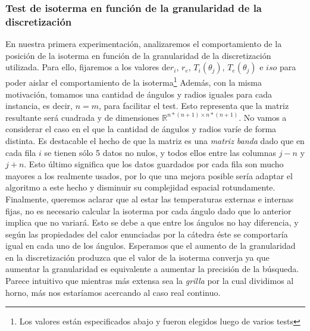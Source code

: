 \subsubsection{Test de isoterma en función de la granularidad de la discretización}

En nuestra primera experimentación, analizaremos el comportamiento de la posición de la isoterma en
función de la granularidad de la discretización utilizada. Para ello, fijaremos a los valores de$r_i$, $r_e$,
$T_i(\theta_j)$, $T_e(\theta_j)$ e $iso$ para poder aislar el comportamiento de la isoterma\footnote{Los
  valores están especificados abajo y fueron elegidos luego de varios tests}
Además, con la misma motivación, tomamos una cantidad de ángulos y radios iguales para cada
instancia, es decir, $n=m$, para facilitar el test.  Esto representa que la matriz resultante será
cuadrada y de dimensiones $\mathbb{R}^{n*(n+1) \times n*(n+1)}$. No vamos a considerar el caso
en el que la cantidad de ángulos y radios varíe de forma distinta. Es destacable el hecho de que la matriz
es una \textit{matriz banda} dado que en cada fila $i$ se tienen sólo 5 datos no nulos, y todos
ellos entre las columnas $j-n$ y $j+n$. Esto último significa que los datos guardados por cada
fila son mucho mayores a los realmente usados, por lo que una mejora posible sería adaptar el algoritmo a 
este hecho y disminuir su complejidad espacial rotundamente.
Finalmente, queremos aclarar que al estar las temperaturas externas e internas fijas, no es necesario calcular la
isoterma por cada ángulo dado que lo anterior implica que no variará. Esto se
debe a que entre los ángulos no hay diferencia, y según las propiedades del calor enunciadas por la
cátedra éste se comportaría igual en cada uno de los ángulos.
Esperamos que el aumento de la granularidad en la discretización produzca que el valor de la isoterma converja
ya que aumentar la granularidad es equivalente a aumentar la precisión de la búsqueda. Parece intuitivo que mientras más
extensa sea la \textit{grilla} por la cual dividimos al horno, más nos estaríamos acercando al caso
real continuo.

